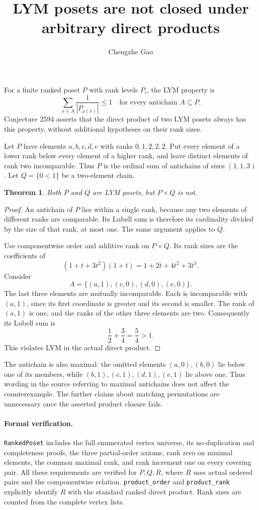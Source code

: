 \documentclass[10pt]{article}
\newtheorem{theorem}{Theorem}
\begin{document}
\title{LYM posets are not closed under arbitrary direct products}
\author{Chengzhe Gao}\date{}\maketitle
For a finite ranked poset $P$ with rank levels $P_i$, the LYM property is
\[
 \sum_{x\in A}\frac1{|P_{\rho(x)}|}\leq1
 \quad\text{for every antichain }A\subseteq P.
\]
Conjecture 2594 asserts that the direct product of two LYM posets always
has this property, without additional hypotheses on their rank sizes.

Let $P$ have elements $a,b,c,d,e$ with ranks $0,1,2,2,2$. Put every element
of a lower rank below every element of a higher rank, and leave distinct
elements of rank two incomparable. Thus $P$ is the ordinal sum of antichains
of sizes $(1,1,3)$. Let $Q=\{0<1\}$ be a two-element chain.

\begin{theorem}
Both $P$ and $Q$ are LYM posets, but $P\times Q$ is not.
\end{theorem}
\begin{proof}
An antichain of $P$ lies within a single rank, because any two elements
of different ranks are comparable. Its Lubell sum is therefore its
cardinality divided by the size of that rank, at most one. The same
argument applies to $Q$.

Use componentwise order and additive rank on $P\times Q$. Its rank sizes
are the coefficients of
\[
 (1+t+3t^2)(1+t)=1+2t+4t^2+3t^3.
\]
Consider
\[
 A=\{(a,1),(c,0),(d,0),(e,0)\}.
\]
The last three elements are mutually incomparable. Each is incomparable
with $(a,1)$, since its first coordinate is greater and its second is
smaller. The rank of $(a,1)$ is one, and the ranks of the other three
elements are two. Consequently its Lubell sum is
\[
 \frac12+\frac34=\frac54>1.
\]
This violates LYM in the actual direct product.
\end{proof}

The antichain is also maximal: the omitted elements $(a,0),(b,0)$ lie
below one of its members, while $(b,1),(c,1),(d,1),(e,1)$ lie above one.
Thus wording in the source referring to maximal antichains does not affect
the counterexample. The further claims about matching permutations are
unnecessary once the asserted product closure fails.

\paragraph{Formal verification.}
\texttt{RankedPoset} includes the full enumerated vertex universe, its
no-duplication and completeness proofs, the three partial-order axioms,
rank zero on minimal elements, the common maximal rank, and rank increment
one on every covering pair. All these requirements are verified for
$P,Q,R$, where $R$ uses actual ordered pairs and the componentwise relation.
\texttt{product\_\allowbreak{}order} and \texttt{product\_\allowbreak{}rank} explicitly identify
$R$ with the standard ranked direct product. Rank sizes are counted from
the complete vertex lists.
\end{document}
